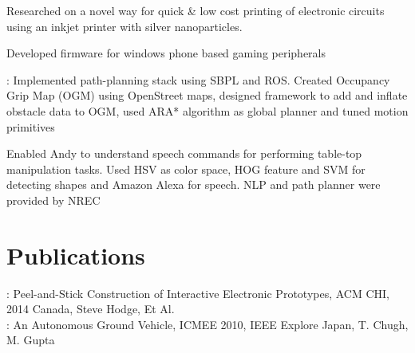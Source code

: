 \documentclass[]{resume-openfont}
\begin{document}
\begin{minipage}[t]{0.63\textwidth}
\begin{tightemize}
\item  Researched on a novel way for quick \& low cost printing of electronic circuits using an inkjet printer with silver nanoparticles.
\item Developed firmware for windows phone based gaming peripherals 
\end{tightemize}
\sectionsep

\begin{tightemize}
\item \href{https://mrsdprojects.ri.cmu.edu/2015teamb/media/fall-and-spring-videos/}{}: Implemented path-planning stack using SBPL and ROS. Created Occupancy Grip  Map (OGM) using OpenStreet maps, designed framework to add and inflate obstacle data to OGM, used ARA* algorithm as global planner and tuned motion primitives
\item \href{http://www.tusharchugh.com/works/andy/}{} 
Enabled Andy to understand speech commands for performing table-top manipulation tasks. Used HSV as color space, HOG feature and SVM for detecting shapes and Amazon Alexa for speech. NLP and path planner were provided by NREC
\end{tightemize}
\sectionsep


\section{Publications}
\href{http://research.microsoft.com/pubs/207114/2014-02-14\%20CHI\%20sticker\%20circuits.pdf}{}: Peel-and-Stick Construction of Interactive Electronic Prototypes, ACM CHI, 2014 Canada, Steve Hodge, Et Al. \\
\href{http://ieeexplore.ieee.org/xpl/login.jsp?tp=&arnumber=5558532&url=http\%3A\%2F\%2Fieeexplore.ieee.org\%2Fxpls\%2Fabs_all.jsp\%3Farnumber\%3D5558532}{}: An Autonomous Ground Vehicle, ICMEE 2010, IEEE Explore Japan, T. Chugh, M. Gupta




\end{minipage}
\end{document}
